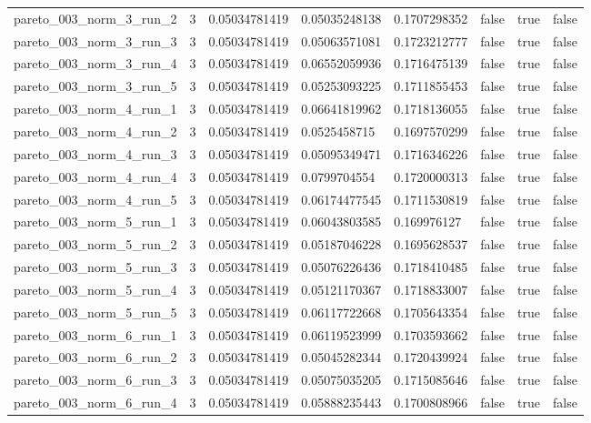 \begin{tabular}{@{}llllllll@{}}
pareto\_003\_norm\_3\_run\_2 & 3 & 0.05034781419 & 0.05035248138 & 0.1707298352 & false & true & false \\
pareto\_003\_norm\_3\_run\_3 & 3 & 0.05034781419 & 0.05063571081 & 0.1723212777 & false & true & false \\
pareto\_003\_norm\_3\_run\_4 & 3 & 0.05034781419 & 0.06552059936 & 0.1716475139 & false & true & false \\
pareto\_003\_norm\_3\_run\_5 & 3 & 0.05034781419 & 0.05253093225 & 0.1711855453 & false & true & false \\
pareto\_003\_norm\_4\_run\_1 & 3 & 0.05034781419 & 0.06641819962 & 0.1718136055 & false & true & false \\
pareto\_003\_norm\_4\_run\_2 & 3 & 0.05034781419 & 0.0525458715 & 0.1697570299 & false & true & false \\
pareto\_003\_norm\_4\_run\_3 & 3 & 0.05034781419 & 0.05095349471 & 0.1716346226 & false & true & false \\
pareto\_003\_norm\_4\_run\_4 & 3 & 0.05034781419 & 0.0799704554 & 0.1720000313 & false & true & false \\
pareto\_003\_norm\_4\_run\_5 & 3 & 0.05034781419 & 0.06174477545 & 0.1711530819 & false & true & false \\
pareto\_003\_norm\_5\_run\_1 & 3 & 0.05034781419 & 0.06043803585 & 0.169976127 & false & true & false \\
pareto\_003\_norm\_5\_run\_2 & 3 & 0.05034781419 & 0.05187046228 & 0.1695628537 & false & true & false \\
pareto\_003\_norm\_5\_run\_3 & 3 & 0.05034781419 & 0.05076226436 & 0.1718410485 & false & true & false \\
pareto\_003\_norm\_5\_run\_4 & 3 & 0.05034781419 & 0.05121170367 & 0.1718833007 & false & true & false \\
pareto\_003\_norm\_5\_run\_5 & 3 & 0.05034781419 & 0.06117722668 & 0.1705643354 & false & true & false \\
pareto\_003\_norm\_6\_run\_1 & 3 & 0.05034781419 & 0.06119523999 & 0.1703593662 & false & true & false \\
pareto\_003\_norm\_6\_run\_2 & 3 & 0.05034781419 & 0.05045282344 & 0.1720439924 & false & true & false \\
pareto\_003\_norm\_6\_run\_3 & 3 & 0.05034781419 & 0.05075035205 & 0.1715085646 & false & true & false \\
pareto\_003\_norm\_6\_run\_4 & 3 & 0.05034781419 & 0.05888235443 & 0.1700808966 & false & true & false \\

\end{tabular}
